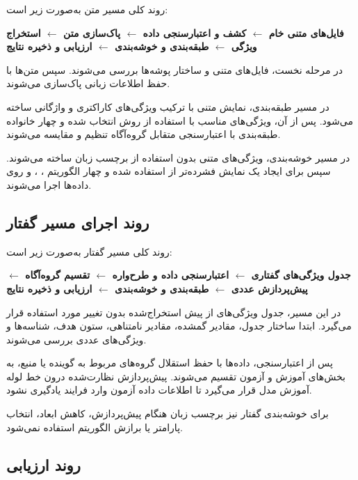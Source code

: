 \documentclass[12pt,a4paper,oneside]{report}
\begin{document}
روند کلی مسیر متن به‌صورت زیر است:

\begin{center}
\textbf{
فایل‌های متنی خام
$\longleftarrow$
کشف و اعتبارسنجی داده
$\longleftarrow$
پاک‌سازی متن
$\longleftarrow$
استخراج ویژگی
$\longleftarrow$
طبقه‌بندی و خوشه‌بندی
$\longleftarrow$
ارزیابی و ذخیره نتایج
}
\end{center}

در مرحله نخست، فایل‌های متنی و ساختار پوشه‌ها بررسی می‌شوند. سپس متن‌ها با حفظ اطلاعات زبانی پاک‌سازی می‌شوند.

در مسیر طبقه‌بندی، نمایش متنی با ترکیب ویژگی‌های کاراکتری و واژگانی
ساخته می‌شود. پس از آن، ویژگی‌های مناسب با استفاده از روش
انتخاب شده و چهار خانواده طبقه‌بندی با اعتبارسنجی متقابل گروه‌آگاه تنظیم و مقایسه می‌شوند.

در مسیر خوشه‌بندی، ویژگی‌های متنی بدون استفاده از برچسب زبان ساخته می‌شوند. سپس برای ایجاد یک نمایش فشرده‌تر از
استفاده شده و چهار الگوریتم
،
،
و
روی داده‌ها اجرا می‌شوند.


\subsection{روند اجرای مسیر گفتار}

روند کلی مسیر گفتار به‌صورت زیر است:

\begin{center}
\textbf{
جدول ویژگی‌های گفتاری
$\longleftarrow$
اعتبارسنجی داده و طرح‌واره
$\longleftarrow$
تقسیم گروه‌آگاه
$\longleftarrow$
پیش‌پردازش عددی
$\longleftarrow$
طبقه‌بندی و خوشه‌بندی
$\longleftarrow$
ارزیابی و ذخیره نتایج
}
\end{center}

در این مسیر، جدول ویژگی‌های از پیش استخراج‌شده بدون تغییر مورد استفاده قرار می‌گیرد. ابتدا ساختار جدول، مقادیر گمشده، مقادیر نامتناهی، ستون هدف، شناسه‌ها و ویژگی‌های عددی بررسی می‌شوند.

پس از اعتبارسنجی، داده‌ها با حفظ استقلال گروه‌های مربوط به گوینده یا منبع، به بخش‌های آموزش و آزمون تقسیم می‌شوند. پیش‌پردازش نظارت‌شده درون خط لوله آموزش مدل قرار می‌گیرد تا اطلاعات داده آزمون وارد فرایند یادگیری نشود.

برای خوشه‌بندی گفتار نیز برچسب زبان هنگام پیش‌پردازش، کاهش ابعاد، انتخاب پارامتر یا برازش الگوریتم استفاده نمی‌شود.


\subsection{روند ارزیابی}
\end{document}
